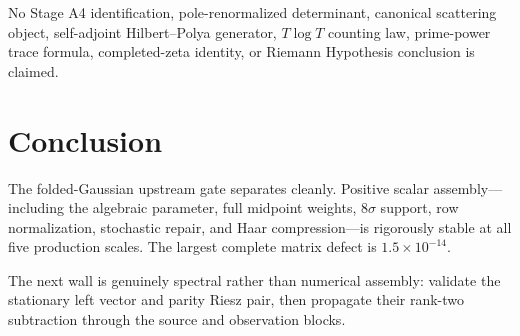 \documentclass[11pt]{article}
\theoremstyle{definition}
\begin{document}
No Stage A4 identification, pole-renormalized determinant, canonical
scattering object, self-adjoint Hilbert--Polya generator, $T\log T$ counting
law, prime-power trace formula, completed-zeta identity, or Riemann
Hypothesis conclusion is claimed.

\section{Conclusion}

The folded-Gaussian upstream gate separates cleanly.  Positive scalar
assembly---including the algebraic parameter, full midpoint weights,
$8\sigma$ support, row normalization, stochastic repair, and Haar
compression---is rigorously stable at all five production scales.  The
largest complete matrix defect is $1.5\times10^{-14}$.

The next wall is genuinely spectral rather than numerical assembly:
validate the stationary left vector and parity Riesz pair, then propagate
their rank-two subtraction through the source and observation blocks.



\end{document}
